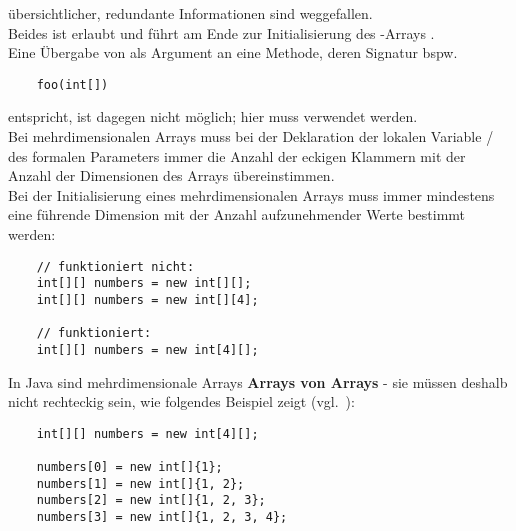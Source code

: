 \noindent
übersichtlicher, redundante Informationen sind weggefallen.\\
Beides ist erlaubt und führt am Ende zur Initialisierung des -Arrays \code{[1, 2, 3, 4]}.\\
Eine Übergabe von  als Argument an eine Methode, deren Signatur bspw.


\begin{verbatim}
    foo(int[])
\end{verbatim}

\noindent
entspricht, ist dagegen nicht möglich; hier muss  verwendet werden.\\

\noindent
Bei mehrdimensionalen Arrays muss bei der Deklaration der lokalen Variable / des formalen Parameters immer die Anzahl der eckigen Klammern \code{[]} mit der Anzahl der Dimensionen des Arrays übereinstimmen.\\
Bei der Initialisierung eines mehrdimensionalen Arrays muss immer mindestens eine führende Dimension mit der Anzahl aufzunehmender Werte bestimmt werden:

\begin{verbatim}
    // funktioniert nicht:
    int[][] numbers = new int[][];
    int[][] numbers = new int[][4];

    // funktioniert:
    int[][] numbers = new int[4][];
\end{verbatim}

In Java sind mehrdimensionale Arrays \textbf{Arrays von Arrays} - sie müssen deshalb nicht rechteckig sein, wie folgendes Beispiel zeigt (vgl.~\cite[273 ff.]{Ull23}):

\begin{verbatim}
    int[][] numbers = new int[4][];

    numbers[0] = new int[]{1};
    numbers[1] = new int[]{1, 2};
    numbers[2] = new int[]{1, 2, 3};
    numbers[3] = new int[]{1, 2, 3, 4};
\end{verbatim}